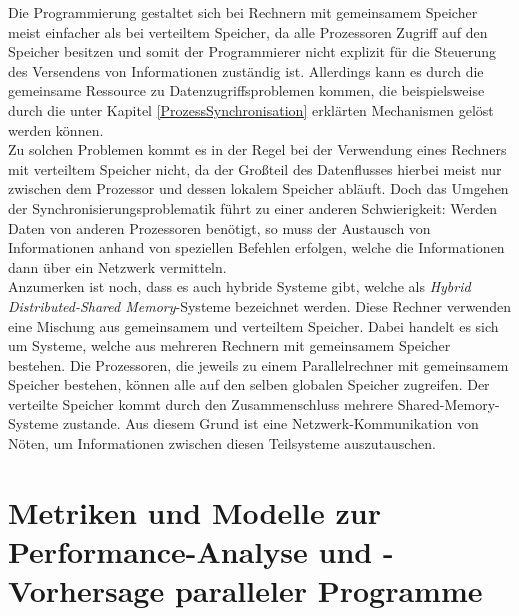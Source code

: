 				Die Programmierung gestaltet sich bei Rechnern mit gemeinsamem Speicher meist einfacher als bei verteiltem Speicher, da alle Prozessoren Zugriff auf den Speicher besitzen und somit der Programmierer nicht explizit für die Steuerung des Versendens von Informationen zuständig ist. Allerdings kann es durch die gemeinsame Ressource zu Datenzugriffsproblemen kommen, die beispielsweise durch die unter Kapitel \ref{ProzessSynchronisation} erklärten Mechanismen gelöst werden können.\\
				Zu solchen Problemen kommt es in der Regel bei der Verwendung eines Rechners mit verteiltem Speicher nicht, da der Großteil des Datenflusses hierbei meist nur zwischen dem Prozessor und dessen lokalem Speicher abläuft. Doch das Umgehen der Synchronisierungsproblematik führt zu einer anderen Schwierigkeit: Werden Daten von anderen Prozessoren benötigt, so muss der Austausch von Informationen anhand von speziellen Befehlen erfolgen, welche die Informationen dann über ein Netzwerk vermitteln. \cite{ParalleleNumerischeVerfahren}\\
				Anzumerken ist noch, dass es auch hybride Systeme gibt, welche als \textit{Hybrid Distributed-Shared Memory}-Systeme bezeichnet werden. Diese Rechner verwenden eine Mischung aus gemeinsamem und verteiltem Speicher. Dabei handelt es sich um Systeme, welche aus mehreren Rechnern mit gemeinsamem Speicher bestehen. Die Prozessoren, die jeweils zu einem Parallelrechner mit gemeinsamem Speicher bestehen, können alle auf den selben globalen Speicher zugreifen. Der verteilte Speicher kommt durch den Zusammenschluss mehrere Shared-Memory-Systeme zustande. Aus diesem Grund ist eine Netzwerk-Kommunikation von Nöten, um Informationen zwischen diesen Teilsysteme auszutauschen. \cite{EntwicklungParallelerProgramme}
				
	\section{Metriken und Modelle zur Performance-Analyse und -Vorhersage paralleler Programme}
		
